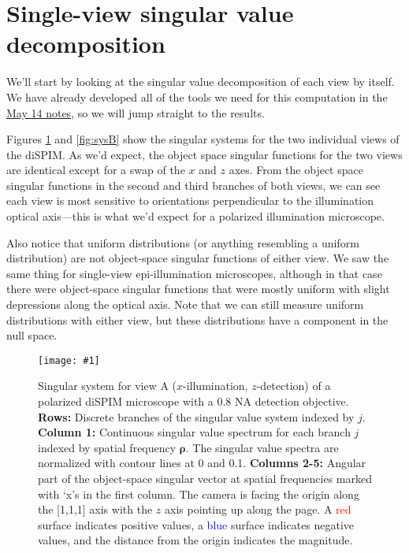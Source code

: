 \documentclass[11pt]{article}
\providecommand{\bs}[1]{\boldsymbol{#1}}
\providecommand{\fig}[4]{
\begin{figure}[h]
 \captionsetup{width=1.0\linewidth}
 \centering
 \texttt{[image: \#1]}
 \caption{#3}
 \label{fig:#4}
\end{figure}
}
\begin{document}
\section{Single-view singular value decomposition}
We'll start by looking at the singular value decomposition of each view by
itself. We have already developed all of the tools we need for this computation
in the
\href{https://github.com/talonchandler/polharmonic/blob/master/notes/2018-05-14-single-view-continuous-svd/report/report.pdf}{May
  14 notes}, so we will jump straight to the results.

Figures \ref{fig:sysA} and \ref{fig:sysB} show the singular systems for the two
individual views of the diSPIM. As we'd expect, the object space singular
functions for the two views are identical except for a swap of the $x$ and $z$
axes. From the object space singular functions in the second and third branches
of both views, we can see each view is most sensitive to orientations
perpendicular to the illumination optical axis---this is what we'd expect for a
polarized illumination microscope.

Also notice that uniform distributions (or anything resembling a uniform
distribution) are not object-space singular functions of either view. We saw the
same thing for single-view epi-illumination microscopes, although in that case
there were object-space singular functions that were mostly uniform with slight
depressions along the optical axis. Note that we can still measure uniform
distributions with either view, but these distributions have a component in the
null space.

\fig{../calculations/out2/SVSx.pdf}{1.0}{Singular system for view A
  ($x$-illumination, $z$-detection) of a polarized diSPIM microscope with a 0.8
  NA detection objective. \textbf{Rows:} Discrete branches of the singular value
  system indexed by $j$. \textbf{Column 1:} Continuous singular value spectrum
  for each branch $j$ indexed by spatial frequency $\bs{\rho}$. The singular
  value spectra are normalized with contour lines at 0 and 0.1. \textbf{Columns
    2-5:} Angular part of the object-space singular vector at spatial
  frequencies marked with `x's in the first column. The camera is facing the
  origin along the [1,1,1] axis with the $z$ axis pointing up along the page. A
  \textcolor{red}{red} surface indicates positive values, a
  \textcolor{blue}{blue} surface indicates negative values, and the distance
  from the origin indicates the magnitude.}{sysA}
\end{document}
